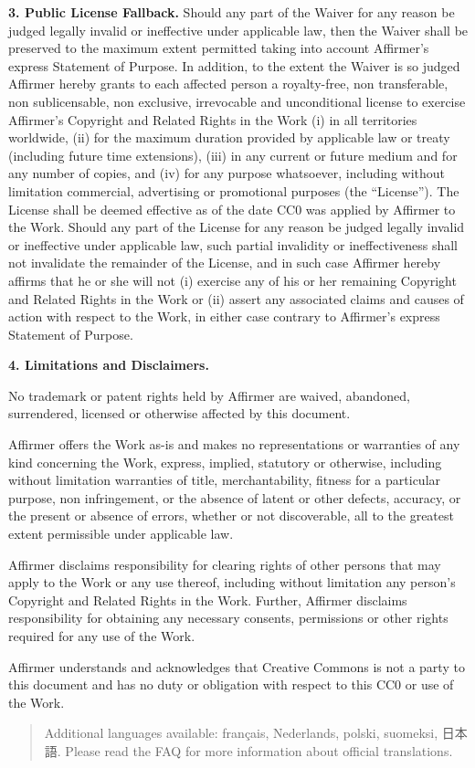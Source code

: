 \par \textbf{3. Public License Fallback.} Should any
part of the Waiver for any reason be judged legally invalid or
ineffective under applicable law, then the Waiver shall be
preserved to the maximum extent permitted taking into account
Affirmer's express Statement of Purpose. In addition, to the
extent the Waiver is so judged Affirmer hereby grants to each
affected person a royalty-free, non transferable, non
sublicensable, non exclusive, irrevocable and unconditional
license to exercise Affirmer's Copyright and Related Rights
in the Work (i) in all territories worldwide, (ii) for the
maximum duration provided by applicable law or treaty
(including future time extensions), (iii) in any current or
future medium and for any number of copies, and (iv) for any
purpose whatsoever, including without limitation commercial,
advertising or promotional purposes (the ``License''). The
License shall be deemed effective as of the date CC0 was
applied by Affirmer to the Work. Should any part of the
License for any reason be judged legally invalid or
ineffective under applicable law, such partial invalidity or
ineffectiveness shall not invalidate the remainder of the
License, and in such case Affirmer hereby affirms that he or
she will not (i) exercise any of his or her remaining
Copyright and Related Rights in the Work or (ii) assert any
associated claims and causes of action with respect to the
Work, in either case contrary to Affirmer's express Statement
of Purpose.
\par \textbf{4. Limitations and Disclaimers.}
\begin{doclicense@enumerate}
\item No trademark or patent rights held by Affirmer are
waived, abandoned, surrendered, licensed or otherwise
affected by this document.
\item Affirmer offers the Work as-is and makes no
representations or warranties of any kind concerning the
Work, express, implied, statutory or otherwise, including
without limitation warranties of title, merchantability,
fitness for a particular purpose, non infringement, or the
absence of latent or other defects, accuracy, or the present
or absence of errors, whether or not discoverable, all to
the greatest extent permissible under applicable law.
\item Affirmer disclaims responsibility for clearing rights of
other persons that may apply to the Work or any use thereof,
including without limitation any person's Copyright and
Related Rights in the Work. Further, Affirmer disclaims
responsibility for obtaining any necessary consents,
permissions or other rights required for any use of the
Work.
\item Affirmer understands and acknowledges that Creative
Commons is not a party to this document and has no duty or
obligation with respect to this CC0 or use of the Work.
\end{doclicense@enumerate}
\begin{quotation}Additional languages available: français, Nederlands, polski, suomeksi, 日本語. Please read the FAQ for more information about official translations.\end{quotation}



